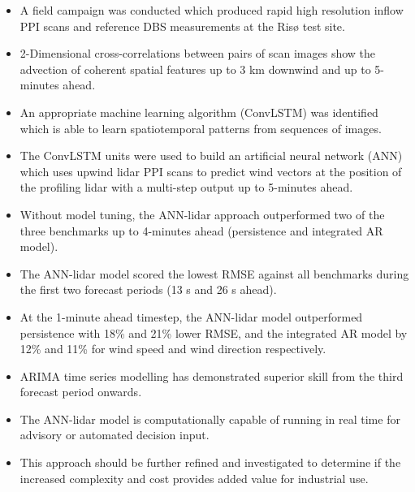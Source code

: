 \begin{itemize}
    \item A field campaign was conducted which produced rapid high resolution inflow PPI scans and reference DBS measurements at the Ris{\o} test site.
    \item 2-Dimensional cross-correlations between pairs of scan images show the advection of coherent spatial features up to 3 km downwind and up to 5-minutes ahead.
    \item An appropriate machine learning algorithm (ConvLSTM) was identified which is able to learn spatiotemporal patterns from sequences of images.
    \item The ConvLSTM units were used to build an artificial neural network (ANN) which uses upwind lidar PPI scans to predict wind vectors at the position of the profiling lidar with a multi-step output up to 5-minutes ahead.
    \item Without model tuning, the ANN-lidar approach outperformed two of the three benchmarks up to 4-minutes ahead (persistence and integrated AR model).
    \item The ANN-lidar model scored the lowest RMSE against all benchmarks during the first two forecast periods (13 s and 26 s ahead).
    \item At the 1-minute ahead timestep, the ANN-lidar model outperformed persistence with 18\% and 21\% lower RMSE, and the integrated AR model by 12\% and 11\% for wind speed and wind direction respectively.
    \item ARIMA time series modelling has demonstrated superior skill from the third forecast period onwards.
    \item The ANN-lidar model is computationally capable of running in real time for advisory or automated decision input.
    \item This approach should be further refined and investigated to determine if the increased complexity and cost provides added value for industrial use.
\end{itemize}